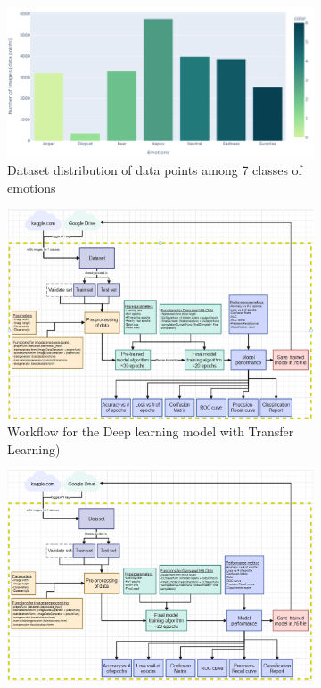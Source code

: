 \documentclass[conference]{IEEEtran}
\begin{document}
\begin{figure}[htbp]
    \centering
    \begin{subfigure}{0.22\textwidth}
        \includegraphics[width=\textwidth]{Figures/Dataset distribution.png}
        \caption{Dataset distribution of data points among 7 classes of emotions}
        \label{fig:datasetdistr}
    \end{subfigure}
    \begin{subfigure}{0.22\textwidth}
        \includegraphics[width=\textwidth]{Figures/Trans_learn_workflow.png}
        \caption{Workflow for the Deep learning model with Transfer Learning)}
        \label{fig:workflow_DLTL}
    \end{subfigure}
    \begin{subfigure}{0.22\textwidth}
        \includegraphics[width=\textwidth]{Figures/no_Trans_learn_workflow.png}

\end{subfigure}
\end{figure}
\end{document}
